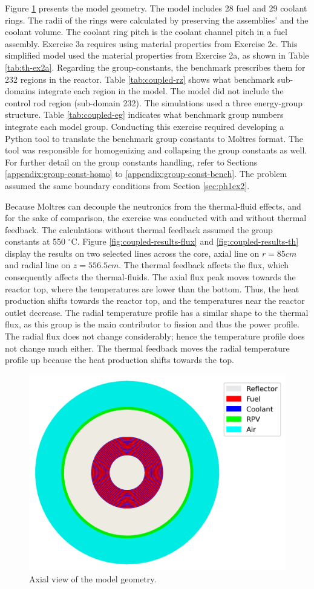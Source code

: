 Figure \ref{fig:coupled-mesh} presents the model geometry.
The model includes 28 fuel and 29 coolant rings.
The radii of the rings were calculated by preserving the assemblies' and the coolant volume.
The coolant ring pitch is the coolant channel pitch in a fuel assembly.
Exercise 3a requires using material properties from Exercise 2c.
This simplified model used the material properties from Exercise 2a, as shown in Table \ref{tab:th-ex2a}.
Regarding the group-constants, the benchmark prescribes them for 232 regions in the reactor.
Table \ref{tab:coupled-rz} shows what benchmark sub-domains integrate each region in the model.
The model did not include the control rod region (sub-domain 232).
The simulations used a three energy-group structure.
Table \ref{tab:coupled-eg} indicates what benchmark group numbers integrate each model group.
Conducting this exercise required developing a Python tool to translate the benchmark group constants to Moltres format.
The tool was responsible for homogenizing and collapsing the group constants as well.
For further detail on the group constants handling, refer to Sections \ref{appendix:group-const-homo} to \ref{appendix:group-const-bench}.
The problem assumed the same boundary conditions from Section \ref{sec:ph1ex2}.

Because Moltres can decouple the neutronics from the thermal-fluid effects, and for the sake of comparison, the exercise was conducted with and without thermal feedback.
The calculations without thermal feedback assumed the group constants at 550 $^{\circ}$C.
Figure \ref{fig:coupled-results-flux} and \ref{fig:coupled-results-th} display the results on two selected lines across the core, axial line on $r=85 cm$ and radial line on $z=556.5 cm$.
The thermal feedback affects the flux, which consequently affects the thermal-fluids.
The axial flux peak moves towards the reactor top, where the temperatures are lower than the bottom.
Thus, the heat production shifts towards the reactor top, and the temperatures near the reactor outlet decrease.
The radial temperature profile has a similar shape to the thermal flux, as this group is the main contributor to fission and thus the power profile.
The radial flux does not change considerably; hence the temperature profile does not change much either.
The thermal feedback moves the radial temperature profile up because the heat production shifts towards the top.

\begin{figure}[htbp!]
  \centering
  \includegraphics[width=0.45\linewidth]{figures-thermal/ex3-mesh}
  \hfill
  \caption{Axial view of the model geometry.}
  \label{fig:coupled-mesh}
\end{figure}

